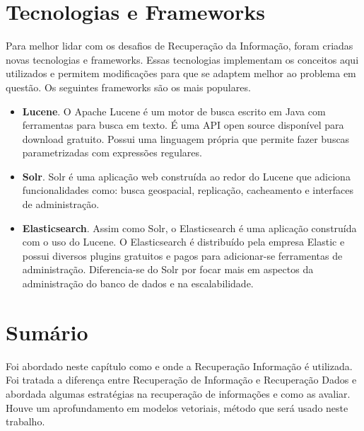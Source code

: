 \section{Tecnologias e Frameworks}

Para melhor lidar com os desafios de Recuperação da Informação, foram criadas novas tecnologias e frameworks. Essas tecnologias implementam os conceitos aqui utilizados e permitem modificações para que se adaptem melhor ao problema em questão. Os seguintes frameworks são os mais populares.

\begin{itemize}
    \item \textbf{Lucene}. O Apache Lucene é um motor de busca escrito em Java com ferramentas para busca em texto. É uma API open source disponível para download gratuito. Possui uma linguagem própria que permite fazer buscas parametrizadas com expressões regulares. 
    \item \textbf{Solr}. Solr é uma aplicação web construída ao redor do Lucene que adiciona funcionalidades como: busca geospacial, replicação, cacheamento e interfaces de administração.
    \item \textbf{Elasticsearch}. Assim como Solr, o Elasticsearch é uma aplicação construída com o uso do Lucene. O Elasticsearch é distribuído pela empresa Elastic e possui diversos plugins gratuitos e pagos para adicionar-se ferramentas de administração. Diferencia-se do Solr por focar mais em aspectos da administração do banco de dados e na escalabilidade.
\end{itemize}

\section{Sumário}

Foi abordado neste capítulo como e onde a Recuperação Informação é utilizada. Foi tratada a diferença entre Recuperação de Informação e Recuperação Dados e abordada algumas estratégias na recuperação de informações e como as avaliar. Houve um aprofundamento em modelos vetoriais, método que será usado neste trabalho.